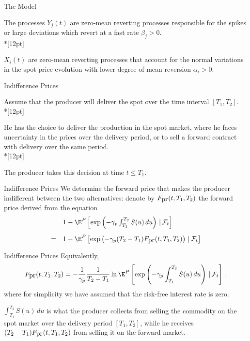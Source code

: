 {The Model}

The processes $Y_j(t)$ are
zero-mean reverting processes responsible for the spikes or large
deviations which revert at a fast rate $\beta_j>0$.\\*[12pt]

$X_i(t)$
are zero-mean reverting processes that account for the normal
variations in the spot price evolution with lower degree of
mean-reversion $\alpha_i>0$.


{Indifference Prices}

Assume that the producer will deliver the spot over the time
interval $[T_1,T_2]$.\\*[12pt]

He has the choice to deliver the production in
the spot market, where he faces uncertainty in the prices over the
delivery period, or to sell a forward contract with delivery over
the same period.\\*[12pt]

The producer takes this decision at time $t\leq
T_1$.

{Indifference Prices}
We determine the forward price that makes the producer indifferent
between the two alternatives: denote by $F_{\hbox{pr}}(t,T_1,T_2)$
the forward price derived from the equation
$$
\begin{array}{ll}

& 1-\E^P\left[\exp\left(-\gamma_p\int_{T_1}^{T_2}S(u)\,du\right)\,|\,
\mathcal{F}_t\right]\\*[12pt]
= & 1-\E^P\left[\exp\left(-\gamma_p(T_2-T_1)F_{\hbox{pr}}(t,T_1,T_2)\right)\,|\,
\mathcal{F}_t\right]
\end{array}
$$

{Indifference Prices}
Equivalently,
\begin{equation}
\label{def-producer}
F_{\hbox{pr}}(t,T_1,T_2)=-\frac1{\gamma_p}\frac1{T_2-T_1}\ln\E^P
\left[\exp\left(-\gamma_p\int_{T_1}^{T_2}S(u)\,du\right)\,|\,
\mathcal{F}_t\right]\,,
\end{equation}
where for simplicity we have assumed that the risk-free interest
rate is zero.

$\int_{T_1}^{T_2}S(u)\,du$ is what the
producer collects from selling the commodity on the spot market
over the delivery period $[T_1,T_2]$, while he receives
$(T_2-T_1)F_{\hbox{pr}}(t,T_1,T_2)$ from selling it on the forward
market.

